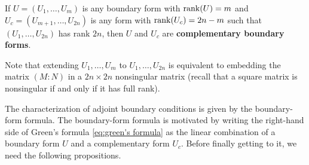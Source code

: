 \documentclass[12pt, oneside, a4paper]{article}
\begin{document}
\begin{defn}\cite[p.287]{CoddingtonLevinson}\label{defn:complementary boundary form}
    If $U=(U_1,\ldots, U_m)$ is any boundary form with $\operatorname{rank}(U)=m$ and $U_c=(U_{m+1},\ldots,U_{2n})$ is any form with $\operatorname{rank}(U_c)=2n-m$ such that $(U_1,\ldots, U_{2n})$ has rank $2n$, then $U$ and $U_c$ are \textbf{complementary boundary forms}. 
    
    Note that extending $U_{1},\ldots, U_{m}$ to $U_1,\ldots,U_{2n}$ is equivalent to embedding the matrix $(M:N)$ in a $2n\times 2n$ nonsingular matrix (recall that a square matrix is nonsingular if and only if it has full rank).
\end{defn}

The characterization of adjoint boundary conditions is given by the boundary-form formula. The boundary-form formula is motivated by writing the right-hand side of Green's formula \eqref{eq:green's formula} as the linear combination of a boundary form $U$ and a complementary form $U_c$. Before finally getting to it, we need the following propositions.
\end{document}
